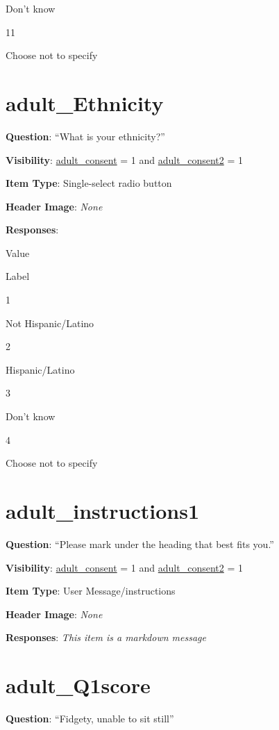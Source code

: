 \documentclass[]{book}
\begin{document}
Don't know

11

Choose not to specify

\hypertarget{adult_ethnicity}{%
\section{adult\_Ethnicity}\label{adult_ethnicity}}

\textbf{Question}: ``What is your ethnicity?''

\textbf{Visibility}: \protect\hyperlink{adult_consent}{adult\_consent} = 1 and \protect\hyperlink{adult_consent2}{adult\_consent2} = 1

\textbf{Item Type}: Single-select radio button

\textbf{Header Image}: \emph{None}

\textbf{Responses}:

Value

Label

1

Not Hispanic/Latino

2

Hispanic/Latino

3

Don't know

4

Choose not to specify

\hypertarget{adult_instructions1}{%
\section{adult\_instructions1}\label{adult_instructions1}}

\textbf{Question}: ``Please mark under the heading that best fits you.''

\textbf{Visibility}: \protect\hyperlink{adult_consent}{adult\_consent} = 1 and \protect\hyperlink{adult_consent2}{adult\_consent2} = 1

\textbf{Item Type}: User Message/instructions

\textbf{Header Image}: \emph{None}

\textbf{Responses}: \emph{This item is a markdown message}

\hypertarget{adult_q1score}{%
\section{adult\_Q1score}\label{adult_q1score}}

\textbf{Question}: ``Fidgety, unable to sit still''
\end{document}
